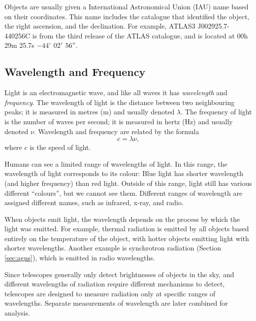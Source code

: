             Objects are usually given a International Astronomical Union (IAU)
            name based on their coordinates. This name includes the catalogue
            that identified the object, the right ascension, and the
            declination. For example, ATLAS3 J002925.7-440256C is from the third
            release of the ATLAS catalogue, and is located at 00h 29m 25.7s
            $-44^\circ$ $02'$ $56"$.

        \subsection{Wavelength and Frequency}
        \label{sec:wavelength}

            Light is an electromagnetic wave, and like all waves it has
            \emph{wavelength} and \emph{frequency}. The wavelength of light is
            the distance between two neighbouring peaks; it is measured in
            metres (m) and usually denoted $\lambda$. The frequency of light is
            the number of waves per second; it is measured in hertz (Hz) and
            usually denoted $\nu$. Wavelength and frequency are related by the
            formula
            \[
                c = \lambda \nu,
            \]
            where $c$ is the speed of light.

            Humans can see a limited range of wavelengths of light. In this
            range, the wavelength of light corresponds to its colour: Blue light
            has shorter wavelength (and higher frequency) than red light.
            Outside of this range, light still has various different
            ``colours'', but we cannot see them. Different ranges of wavelength
            are assigned different names, such as infrared, x-ray, and radio.

            When objects emit light, the wavelength depends on the process by
            which the light was emitted. For example, thermal radiation is
            emitted by all objects based entirely on the temperature of the
            object, with hotter objects emitting light with shorter wavelengths.
            Another example is synchrotron radiation (Section \ref{sec:agns}),
            which is emitted in radio wavelengths.

            Since telescopes generally only detect brightnesses of objects in
            the sky, and different wavelengths of radiation require different
            mechanisms to detect, telescopes are designed to measure radiation
            only at specific ranges of wavelengths. Separate measurements of
            wavelength are later combined for analysis.

